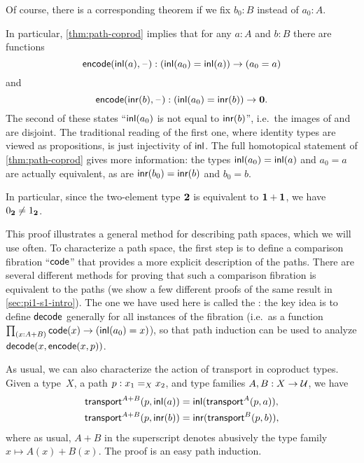 \noindent
Of course, there is a corresponding theorem if we fix $b_0:B$ instead of $a_0:A$.

In particular, \cref{thm:path-coprod} implies that for any $a : A$ and $b : B$ there are functions
%
\[ \encode(\inl(a), {\blank}) : (\inl(a_0)=\inl(a)) \to (a_0=a)\]
%
and
%
\[ \encode(\inr(b), {\blank}) : (\inl(a_0)=\inr(b)) \to \emptyt. \]
%
The second of these states
``$\inl(a_0)$ is not equal to $\inr(b)$'', i.e.\ the images of \inl and \inr are disjoint. The traditional reading of the first one, where identity types are viewed as propositions, is just injectivity of $\inl$.  The
full homotopical statement of \cref{thm:path-coprod} gives more information: the types $\inl(a_0)=\inl(a)$ and
$a_0=a$ are actually equivalent, as are $\inr(b_0)=\inr(b)$ and $b_0=b$.

\begin{rmk}\label{rmk:true-neq-false}
In particular, since the two-element type $\bool$ is equivalent to $\unit+\unit$, we have $\bfalse\neq\btrue$.
\end{rmk}

This proof illustrates a general method for describing path spaces, which we will use often.  To characterize a path space, the first step is to define a comparison fibration ``$\code$'' that provides a more explicit description of the paths.  There are several different methods for proving that such a comparison fibration is equivalent to the paths (we show a few different proofs of the same result in \cref{sec:pi1-s1-intro}).  The one we have used here is called the :
the key idea is to define $\decode$ generally for all instances of the fibration (i.e.\ as a function $\prd{x:A+B} \code(x) \to (\inl(a_0)=x)$), so that path induction can be used to analyze $\decode(x,\encode(x,p))$.

%
As usual, we can also characterize the action of transport in coproduct types.
Given a type~$X$, a path $p:\id[X]{x_1}{x_2}$, and type families $A,B:X\to\type$, we have
\begin{align*}
  \transfib{A+B}{p}{\inl(a)} &= \inl (\transfib{A}{p}{a}),\\
  \transfib{A+B}{p}{\inr(b)} &= \inr (\transfib{B}{p}{b}),
\end{align*}
where as usual, $A+B$ in the superscript denotes abusively the type family $x\mapsto A(x)+B(x)$.
The proof is an easy path induction.

%
%

